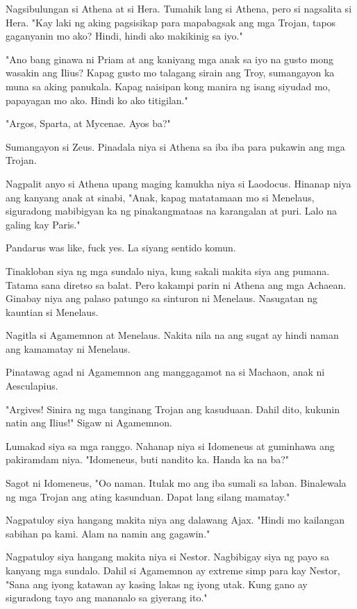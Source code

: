 \documentclass[12pt,letterpaper]{report}
\begin{document}
Nagsibulungan si Athena at si Hera. Tumahik lang si Athena, pero si nagsalita si Hera.
"Kay laki ng aking pagsisikap para mapabagsak ang mga Trojan, tapos gaganyanin mo ako?
Hindi, hindi ako makikinig sa iyo."

"Ano bang ginawa ni Priam at ang kaniyang mga anak sa iyo na gusto mong wasakin ang Ilius?
Kapag gusto mo talagang sirain ang Troy, sumangayon ka muna sa aking panukala.
Kapag naisipan kong manira ng isang siyudad mo, papayagan mo ako. Hindi ko ako titigilan."

"Argos, Sparta, at Mycenae. Ayos ba?"

Sumangayon si Zeus. Pinadala niya si Athena sa iba iba para pukawin ang mga Trojan.

Nagpalit anyo si Athena upang maging kamukha niya si Laodocus. Hinanap niya ang kanyang anak at sinabi,
"Anak, kapag matatamaan mo si Menelaus, siguradong mabibigyan ka ng pinakangmataas na karangalan at puri.
Lalo na galing kay Paris."

Pandarus was like, fuck yes. La siyang sentido komun.

Tinakloban siya ng mga sundalo niya, kung sakali makita siya ang pumana. Tatama sana diretso sa balat.
Pero kakampi parin ni Athena ang mga Achaean. Ginabay niya ang palaso patungo sa sinturon ni Menelaus.
Nasugatan ng kauntian si Menelaus.

Nagitla si Agamemnon at Menelaus. Nakita nila na ang sugat ay hindi naman ang kamamatay ni Menelaus.

Pinatawag agad ni Agamemnon ang manggagamot na si Machaon, anak ni Aesculapius.

"Argives! Sinira ng mga tanginang Trojan ang kasuduaan. Dahil dito, kukunin natin ang Ilius!" Sigaw ni Agamemnon.

Lumakad siya sa mga ranggo. Nahanap niya si Idomeneus at guminhawa ang pakiramdam niya.
"Idomeneus, buti nandito ka. Handa ka na ba?"

Sagot ni Idomeneus, "Oo naman. Itulak mo ang iba sumali sa laban. Binalewala ng mga Trojan ang ating kasunduan.
Dapat lang silang mamatay."

Nagpatuloy siya hangang makita niya ang dalawang Ajax. "Hindi mo kailangan sabihan pa kami. Alam na namin ang gagawin."

Nagpatuloy siya hangang makita niya si Nestor. Nagbibigay siya ng payo sa kanyang mga sundalo.
Dahil si Agamemnon ay extreme simp para kay Nestor, "Sana ang iyong katawan ay kasing lakas ng iyong utak.
Kung gano ay siguradong tayo ang mananalo sa giyerang ito."
\end{document}

